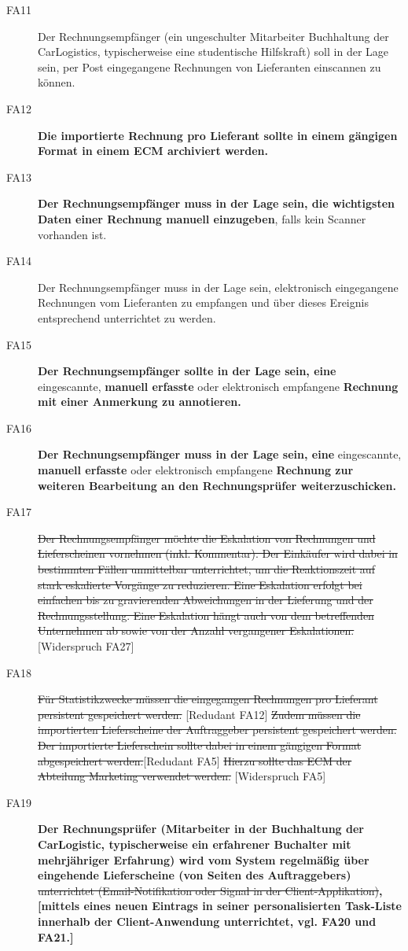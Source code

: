 \begin{description}
  \item[FA11] Der Rechnungsempfänger (ein ungeschulter Mitarbeiter Buchhaltung der CarLogistics, typischerweise eine studentische Hilfskraft) soll in der Lage sein, per Post eingegangene Rechnungen von Lieferanten einscannen zu können.
  \item[FA12] \textbf{Die importierte Rechnung pro Lieferant sollte in einem gängigen Format in einem ECM archiviert werden.}
  \item[FA13] \textbf{Der Rechnungsempfänger muss in der Lage sein, die wichtigsten Daten einer Rechnung manuell einzugeben}, falls kein Scanner vorhanden ist.
  \item[FA14] Der Rechnungsempfänger muss in der Lage sein, elektronisch eingegangene Rechnungen vom Lieferanten zu empfangen und über dieses Ereignis entsprechend unterrichtet zu werden.
  \item[FA15] \textbf{Der Rechnungsempfänger sollte in der Lage sein, eine} eingescannte, \textbf{manuell erfasste} oder elektronisch empfangene \textbf{Rechnung mit einer Anmerkung zu annotieren.}
  \item[FA16] \textbf{Der Rechnungsempfänger muss in der Lage sein, eine} eingescannte, \textbf{manuell erfasste} oder elektronisch empfangene \textbf{Rechnung zur weiteren Bearbeitung an den Rechnungsprüfer weiterzuschicken.}
  \item[FA17] \sout{Der Rechnungsempfänger möchte die Eskalation von Rechnungen und Lieferscheinen vornehmen (inkl. Kommentar). Der Einkäufer wird dabei in bestimmten Fällen unmittelbar unterrichtet, um die Reaktionszeit auf stark eskalierte Vorgänge zu reduzieren. Eine Eskalation erfolgt bei einfachen bis zu gravierenden Abweichungen in der Lieferung und der Rechnungsstellung. Eine Eskalation hängt auch von dem betreffenden Unternehmen ab sowie von der Anzahl vergangener Eskalationen.} [Widerspruch FA27]
  \item[FA18] \sout{Für Statistikzwecke müssen die eingegangen Rechnungen pro Lieferant persistent gespeichert werden.} [Redudant FA12] \sout{Zudem müssen die importierten Lieferscheine der Auftraggeber persistent gespeichert werden. Der importierte Lieferschein sollte dabei in einem gängigen Format abgespeichert werden.}[Redudant FA5] \sout{Hierzu sollte das ECM der Abteilung Marketing verwendet werden.} [Widerspruch FA5]
   \item[FA19] \textbf{Der Rechnungsprüfer (Mitarbeiter in der Buchhaltung der CarLogistic, typischerweise ein erfahrener Buchalter mit mehrjähriger Erfahrung) wird vom System regelmäßig über eingehende Lieferscheine (von Seiten des Auftraggebers)} \sout{unterrichtet (Email-Notifikation oder Signal in der Client-Applikation)}\textbf{, [mittels eines neuen Eintrags in seiner personalisierten Task-Liste innerhalb der Client-Anwendung unterrichtet, vgl. FA20 und FA21.]}

\end{description}
